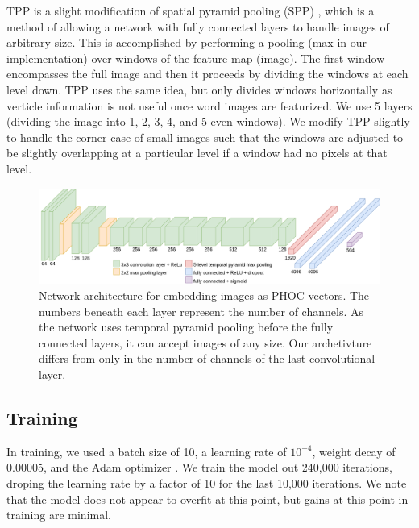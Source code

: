 \documentclass[ms,electronic,twosidetoc,letterpaper,chaptercenter,parttop,lol,lof,lot]{byumsphd}
\begin{document}
TPP is a slight modification of spatial pyramid pooling (SPP) \cite{SPP}, which is a method of allowing a network with fully connected layers to handle images of arbitrary size. This is accomplished by performing a pooling (max in our implementation) over windows of the feature map (image). The first window encompasses the full image and then it proceeds by dividing the windows at each level down. TPP uses the same idea, but only divides windows horizontally as verticle information is not useful once word images are featurized. We use 5 layers (dividing the image into 1, 2, 3, 4, and 5 even windows). %
We modify TPP slightly to handle the corner case of small images such that the windows are adjusted to be slightly overlapping at a particular level if a window had no pixels at that level.

\begin{figure}[t]
    \centering
    \includegraphics[width=.98\textwidth]{thesis-phocnet}
    \caption{Network architecture for embedding images as PHOC vectors. The numbers beneath each layer represent the number of channels. As the network uses temporal pyramid pooling before the fully connected layers, it can accept images of any size. Our archetivture differs from \cite{sudholt2017} only in the number of channels of the last convolutional layer.}
    \label{fig:network}
\end{figure}

\subsection{Training}

In training, we used a batch size of 10, a learning rate of $10^{-4}$, weight decay of 0.00005, and the Adam optimizer \cite{adam}.
We train the model out 240,000 iterations, droping the learning rate by a factor of 10 for the last 10,000 iterations. We note that the model does not appear to overfit at this point, but gains at this point in training are minimal.
\end{document}
